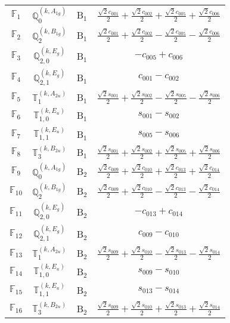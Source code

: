 \documentclass[fleqn,10pt,landscape]{article}
\begin{document}
\begin{itemize}
\begin{center}
\begin{longtable}{c|c|c|c}
$ \mathbb{F}_{1} $ & $\mathbb{Q}_{0}^{(k,A_{1g})}$ & B$_{1}$ & $\frac{\sqrt{2} c_{001}}{2} + \frac{\sqrt{2} c_{002}}{2} + \frac{\sqrt{2} c_{005}}{2} + \frac{\sqrt{2} c_{006}}{2}$ \\
$ \mathbb{F}_{2} $ & $\mathbb{Q}_{2}^{(k,B_{1g})}$ & B$_{1}$ & $\frac{\sqrt{2} c_{001}}{2} + \frac{\sqrt{2} c_{002}}{2} - \frac{\sqrt{2} c_{005}}{2} - \frac{\sqrt{2} c_{006}}{2}$ \\
$ \mathbb{F}_{3} $ & $\mathbb{Q}_{2,0}^{(k,E_{g})}$ & B$_{1}$ & $- c_{005} + c_{006}$ \\
$ \mathbb{F}_{4} $ & $\mathbb{Q}_{2,1}^{(k,E_{g})}$ & B$_{1}$ & $c_{001} - c_{002}$ \\
$ \mathbb{F}_{5} $ & $\mathbb{T}_{1}^{(k,A_{2u})}$ & B$_{1}$ & $\frac{\sqrt{2} s_{001}}{2} + \frac{\sqrt{2} s_{002}}{2} - \frac{\sqrt{2} s_{005}}{2} - \frac{\sqrt{2} s_{006}}{2}$ \\
$ \mathbb{F}_{6} $ & $\mathbb{T}_{1,0}^{(k,E_{u})}$ & B$_{1}$ & $s_{001} - s_{002}$ \\
$ \mathbb{F}_{7} $ & $\mathbb{T}_{1,1}^{(k,E_{u})}$ & B$_{1}$ & $s_{005} - s_{006}$ \\
$ \mathbb{F}_{8} $ & $\mathbb{T}_{3}^{(k,B_{2u})}$ & B$_{1}$ & $\frac{\sqrt{2} s_{001}}{2} + \frac{\sqrt{2} s_{002}}{2} + \frac{\sqrt{2} s_{005}}{2} + \frac{\sqrt{2} s_{006}}{2}$ \\ \hline
$ \mathbb{F}_{9} $ & $\mathbb{Q}_{0}^{(k,A_{1g})}$ & B$_{2}$ & $\frac{\sqrt{2} c_{009}}{2} + \frac{\sqrt{2} c_{010}}{2} + \frac{\sqrt{2} c_{013}}{2} + \frac{\sqrt{2} c_{014}}{2}$ \\
$ \mathbb{F}_{10} $ & $\mathbb{Q}_{2}^{(k,B_{1g})}$ & B$_{2}$ & $\frac{\sqrt{2} c_{009}}{2} + \frac{\sqrt{2} c_{010}}{2} - \frac{\sqrt{2} c_{013}}{2} - \frac{\sqrt{2} c_{014}}{2}$ \\
$ \mathbb{F}_{11} $ & $\mathbb{Q}_{2,0}^{(k,E_{g})}$ & B$_{2}$ & $- c_{013} + c_{014}$ \\
$ \mathbb{F}_{12} $ & $\mathbb{Q}_{2,1}^{(k,E_{g})}$ & B$_{2}$ & $c_{009} - c_{010}$ \\
$ \mathbb{F}_{13} $ & $\mathbb{T}_{1}^{(k,A_{2u})}$ & B$_{2}$ & $\frac{\sqrt{2} s_{009}}{2} + \frac{\sqrt{2} s_{010}}{2} - \frac{\sqrt{2} s_{013}}{2} - \frac{\sqrt{2} s_{014}}{2}$ \\
$ \mathbb{F}_{14} $ & $\mathbb{T}_{1,0}^{(k,E_{u})}$ & B$_{2}$ & $s_{009} - s_{010}$ \\
$ \mathbb{F}_{15} $ & $\mathbb{T}_{1,1}^{(k,E_{u})}$ & B$_{2}$ & $s_{013} - s_{014}$ \\
$ \mathbb{F}_{16} $ & $\mathbb{T}_{3}^{(k,B_{2u})}$ & B$_{2}$ & $\frac{\sqrt{2} s_{009}}{2} + \frac{\sqrt{2} s_{010}}{2} + \frac{\sqrt{2} s_{013}}{2} + \frac{\sqrt{2} s_{014}}{2}$ \\
\end{longtable}
\end{center}


\end{itemize}
\end{document}

